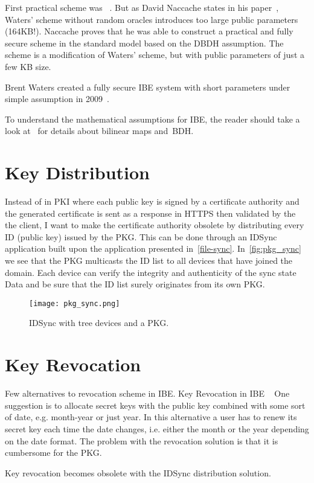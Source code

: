 First practical scheme was ~\cite{DBLP:journals/iacr/Waters04}.
But as David Naccache states in his paper~\cite{DBLP:journals/iacr/Naccache05}, Waters' scheme without random oracles introduces too large public parameters (164\gls{KB}!).
Naccache proves that he was able to construct a practical and fully secure scheme in the standard model based on the \gls{DBDH} assumption.
The scheme is a modification of Waters' scheme, but with public parameters of just a few \gls{KB} size.

Brent Waters created a fully secure \gls{IBE} system with short parameters under simple assumption in 2009~\cite{DBLP:conf/crypto/Waters09}.

To understand the mathematical assumptions for \gls{IBE}, the reader should take a look at~\cite[section 3]{DBLP:conf/crypto/BonehF01} for details about bilinear maps and~\gls{BDH}.

\section{Key Distribution}
Instead of in \gls{PKI} where each public key is signed by a certificate authority and the generated certificate is sent as a response in \gls{HTTPS} then validated by the the client, I want to make the certificate authority obsolete by distributing every \gls{ID} (public key) issued by the \gls{PKG}.
This can be done through an IDSync application built upon the application presented in~\autoref{file-sync}.
In~\autoref{fig:pkg_sync} we see that the \gls{PKG} multicasts the \gls{ID} list to all devices that have joined the domain.
Each device can verify the integrity and authenticity of the sync state Data and be sure that the \gls{ID} list surely originates from its own \gls{PKG}.
\begin{figure}[ht]
  \centering
  \texttt{[image: pkg\_sync.png]}
  \caption{IDSync with tree devices and a PKG.}
  \label{fig:pkg_sync}
\end{figure}


\section{Key Revocation}
Few alternatives to revocation scheme in \gls{IBE}.
Key Revocation in IBE ~\cite{DBLP:journals/iacr/BoldyrevaGK12} 
One suggestion is to allocate secret keys with the public key combined with some sort of date, e.g. month-year or just year. 
In this alternative a user has to renew its secret key each time the date changes, i.e. either the month or the year depending on the date format.
The problem with the revocation solution is that it is cumbersome for the \gls{PKG}.

Key revocation becomes obsolete with the IDSync distribution solution. 
